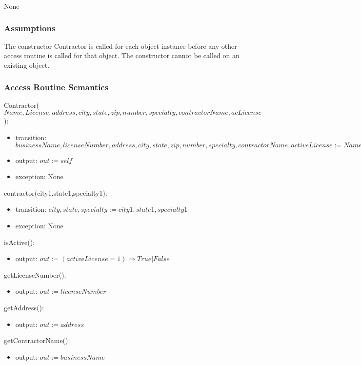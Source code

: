 \documentclass[12pt]{article}
\begin{document}
None

\subsubsection* {Assumptions}

The constructor Contractor is called for each object instance before any other
access routine is called for that object.  The constructor cannot be called on
an existing object.

\subsubsection* {Access Routine Semantics}

Contractor($Name,License,address,city,state,zip,number,specialty, contractorName, acLicense$):
\begin{itemize}
\item transition: $ businessName, licenseNumber, address, city, state, zip, number, specialty, contractorName, activeLicense:= Name,License,address,city,state,zip,number,specialty, contractorName,acLicense$
\item output: $out := \mathit{self}$
\item exception: None
\end{itemize}

\noindent contractor(city1,state1,specialty1):
\begin{itemize}
\item transition: $city, state, specialty := city1, state1, specialty1$
\item exception: None
\end{itemize}

\noindent isActive():
\begin{itemize}
\item output: $out := (activeLicense = 1) \Rightarrow True | False$
\end{itemize}

\noindent getLicenseNumber():
\begin{itemize}
\item output: $out := licenseNumber$
\end{itemize}


\noindent getAddress():
\begin{itemize}
\item output: $out := address$
\end{itemize}

\noindent getContractorName():
\begin{itemize}
\item output: $out := businessName$
\end{itemize}
\end{document}
